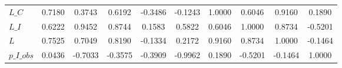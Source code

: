 \begin{center}
\begin{longtable}{lccccccccc}
$L\_C            $	 & 	            0.7180	 & 	            0.3743	 & 	            0.6192	 & 	           -0.3486	 & 	           -0.1243	 & 	            1.0000	 & 	            0.6046	 & 	            0.9160	 & 	            0.1890 \\ 
$L\_I            $	 & 	            0.6222	 & 	            0.9452	 & 	            0.8744	 & 	            0.1583	 & 	            0.5822	 & 	            0.6046	 & 	            1.0000	 & 	            0.8734	 & 	           -0.5201 \\ 
$L               $	 & 	            0.7525	 & 	            0.7049	 & 	            0.8190	 & 	           -0.1334	 & 	            0.2172	 & 	            0.9160	 & 	            0.8734	 & 	            1.0000	 & 	           -0.1464 \\ 
$p\_I\_obs       $	 & 	            0.0436	 & 	           -0.7033	 & 	           -0.3575	 & 	           -0.3909	 & 	           -0.9962	 & 	            0.1890	 & 	           -0.5201	 & 	           -0.1464	 & 	            1.0000 \\ 
\end{longtable}
 \end{center}
